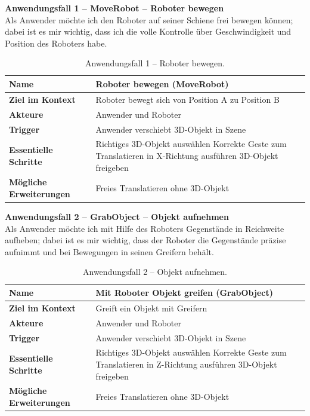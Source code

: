 \textbf{Anwendungsfall 1 -- MoveRobot -- Roboter bewegen}\\
\frqq Als Anwender möchte ich den Roboter auf seiner Schiene frei bewegen können; dabei ist es mir wichtig, dass ich die volle Kontrolle über Geschwindigkeit und Position des Roboters habe.\flqq
\begin{table}[H]
	\centering
	\begin{tabular}{|l|p{8cm}|}
		\hline
		\textbf{Name} & Roboter bewegen (MoveRobot) \\
		\hline
		\textbf{Ziel im Kontext} & Roboter bewegt sich von Position A zu Position B \\
		\hline
		\textbf{Akteure} & Anwender und Roboter \\
		\hline
		\textbf{Trigger} & Anwender verschiebt 3D-Objekt in Szene \\
		\hline
		\textbf{Essentielle Schritte} & Richtiges 3D-Objekt auswählen \newline Korrekte Geste zum Translatieren in X-Richtung ausführen \newline 3D-Objekt freigeben \\
		\hline
		\textbf{Mögliche Erweiterungen} & Freies Translatieren ohne 3D-Objekt \\
		\hline
	\end{tabular}
	\caption{Anwendungsfall 1 -- \frqq Roboter bewegen\flqq.}
	\label{tab:usecase1}
\end{table}
\textbf{Anwendungsfall 2 -- GrabObject -- Objekt aufnehmen}\\
\frqq Als Anwender möchte ich mit Hilfe des Roboters Gegenstände in Reichweite aufheben; dabei ist es mir wichtig, dass der Roboter die Gegenstände präzise aufnimmt und bei Bewegungen in seinen Greifern behält.\flqq
\begin{table}[H]
	\centering
	\begin{tabular}{|l|p{8cm}|}
		\hline
		\textbf{Name} & Mit Roboter Objekt greifen (GrabObject) \\
		\hline
		\textbf{Ziel im Kontext} & Greift ein Objekt mit Greifern \\
		\hline
		\textbf{Akteure} & Anwender und Roboter \\
		\hline
		\textbf{Trigger} & Anwender verschiebt 3D-Objekt in Szene \\
		\hline
		\textbf{Essentielle Schritte} & Richtiges 3D-Objekt auswählen \newline Korrekte Geste zum Translatieren in Z-Richtung ausführen \newline 3D-Objekt freigeben \\
		\hline
		\textbf{Mögliche Erweiterungen} & Freies Translatieren ohne 3D-Objekt \\
		\hline
	\end{tabular}
	\caption{Anwendungsfall 2 -- \frqq Objekt aufnehmen\flqq.}
	\label{tab:usecase2}
\end{table}
